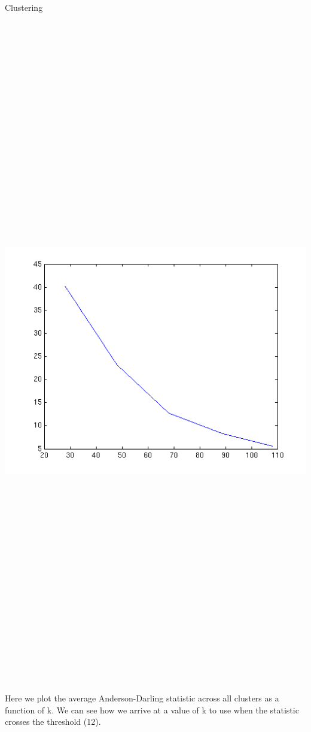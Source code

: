 \documentclass[final,t]{beamer}
\begin{document}
\begin{frame}{}
\begin{columns}[t]
\begin{column}{.3\linewidth}
\begin{block}{Clustering}
       \begin{columns}[b]
\includegraphics[width=60cm,height=36cm]{images/gmeans_k_vs_metric.png} 
Here we plot the average Anderson-Darling statistic across all
clusters as a function of k. We can see how we arrive at a value of k
to use when the statistic crosses the threshold (12).
       \end{columns} 


\end{block}
\end{column}
\end{columns}
\end{frame}
\end{document}
